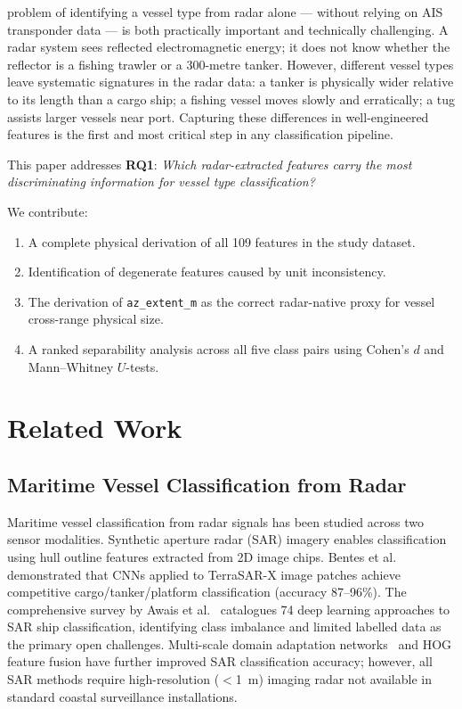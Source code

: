 \documentclass[journal]{IEEEtran}
\begin{document}
 problem of identifying a vessel type from radar alone ---
without relying on AIS transponder data --- is both practically important and
technically challenging.
A radar system sees reflected electromagnetic energy; it does not know whether
the reflector is a fishing trawler or a 300-metre tanker. However, different
vessel types leave systematic signatures in the radar data: a tanker is physically
wider relative to its length than a cargo ship; a fishing vessel moves slowly and
erratically; a tug assists larger vessels near port. Capturing these differences
in well-engineered features is the first and most critical step in any
classification pipeline.

This paper addresses \textbf{RQ1}: \textit{Which radar-extracted features carry
the most discriminating information for vessel type classification?}

We contribute:
\begin{enumerate}
  \item A complete physical derivation of all 109 features in the study dataset.
  \item Identification of degenerate features caused by unit inconsistency.
  \item The derivation of \texttt{az\_extent\_m} as the correct radar-native
        proxy for vessel cross-range physical size.
  \item A ranked separability analysis across all five class pairs using
        Cohen's $d$ and Mann--Whitney $U$-tests.
\end{enumerate}

\section{Related Work}
\label{sec:relatedwork}

\subsection{Maritime Vessel Classification from Radar}

Maritime vessel classification from radar signals has been studied across two sensor modalities. Synthetic aperture radar (SAR) imagery enables classification using hull outline features extracted from 2D image chips. Bentes et al.~\cite{bentes2017sar} demonstrated that CNNs applied to TerraSAR-X image patches achieve competitive cargo/tanker/platform classification (accuracy 87--96\%). The comprehensive survey by Awais et al.~\cite{awais2025survey} catalogues 74 deep learning approaches to SAR ship classification, identifying class imbalance and limited labelled data as the primary open challenges. Multi-scale domain adaptation networks~\cite{zhang2021hog} and HOG feature fusion have further improved SAR classification accuracy; however, all SAR methods require high-resolution ($<$1~m) imaging radar not available in standard coastal surveillance installations.
\end{document}
